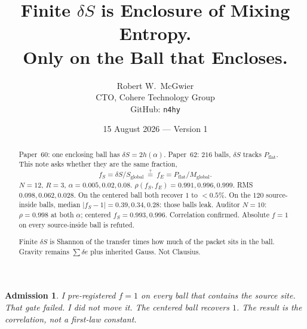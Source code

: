 \documentclass[11pt]{article}
\title{\textbf{Finite $\delta S$ is Enclosure of Mixing Entropy.\\
Only on the Ball that Encloses.}}
\author{Robert W.\ McGwier\\
\small CTO, Cohere Technology Group\\
\small GitHub: \texttt{n4hy}}
\date{15 August 2026 --- Version 1}
\newtheorem*{admission}{Admission}
\begin{document}
\maketitle

\begin{abstract}
\noindent
Paper~60: one enclosing ball has $\delta S=2h(\alpha)$.
Paper~62: $216$ balls, $\delta S$ tracks $P_{\mathrm{flat}}$.
This note asks whether they are the same fraction,
\[
f_S=\delta S/S_{\mathrm{global}}\ \stackrel{?}{=}\
f_E=P_{\mathrm{flat}}/M_{\mathrm{global}}.
\]
$N=12$, $R=3$, $\alpha=0.005,0.02,0.08$.
$\rho(f_S,f_E)=0.991,0.996,0.999$.
RMS $0.098,0.062,0.028$.
On the centered ball both recover $1$ to $<0.5\%$.
On the $120$ source-inside balls, median
$\lvert f_S-1\rvert=0.39,0.34,0.28$: those balls leak.
Auditor $N=10$: $\rho=0.998$ at both $\alpha$;
centered $f_S=0.993,0.996$. Correlation confirmed.
Absolute $f=1$ on every source-inside ball is refuted.

Finite $\delta S$ is Shannon of the transfer times how
much of the packet sits in the ball. Gravity remains
$\sum\delta e$ plus inherited Gauss. Not Clausius.
\end{abstract}

\begin{admission}
I pre-registered $f=1$ on every ball that contains the
source site. That gate failed. I did not move it. The
centered ball recovers $1$. The result is the
correlation, not a first-law constant.
\end{admission}
\end{document}
